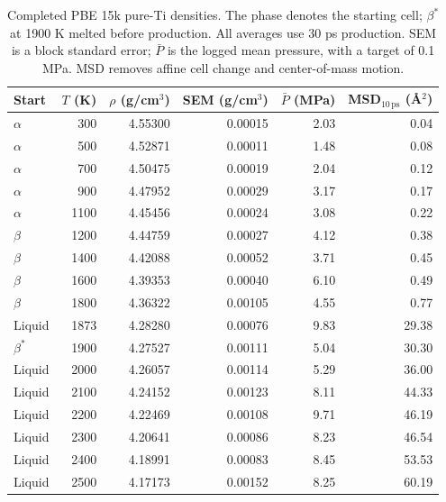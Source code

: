 \begin{table}[htbp]
\centering\small
\caption{Completed PBE 15k pure-Ti densities. The phase denotes the starting cell; $\beta^\ast$ at 1900 K melted before production. All averages use 30 ps production. SEM is a block standard error; $\bar P$ is the logged mean pressure, with a target of 0.1 MPa. MSD removes affine cell change and center-of-mass motion.}
\label{tab:ti_density_temperature15k}
\begin{tabular}{lrrrrr}
\toprule
Start & $T$ (K) & $\rho$ (g/cm$^3$) & SEM (g/cm$^3$) & $\bar P$ (MPa) & MSD$_{10\,\mathrm{ps}}$ (\AA$^2$)\\
\midrule
$\alpha$ & 300 & 4.55300 & 0.00015 & 2.03 & 0.04\\
$\alpha$ & 500 & 4.52871 & 0.00011 & 1.48 & 0.08\\
$\alpha$ & 700 & 4.50475 & 0.00019 & 2.04 & 0.12\\
$\alpha$ & 900 & 4.47952 & 0.00029 & 3.17 & 0.17\\
$\alpha$ & 1100 & 4.45456 & 0.00024 & 3.08 & 0.22\\
$\beta$ & 1200 & 4.44759 & 0.00027 & 4.12 & 0.38\\
$\beta$ & 1400 & 4.42088 & 0.00052 & 3.71 & 0.45\\
$\beta$ & 1600 & 4.39353 & 0.00040 & 6.10 & 0.49\\
$\beta$ & 1800 & 4.36322 & 0.00105 & 4.55 & 0.77\\
Liquid & 1873 & 4.28280 & 0.00076 & 9.83 & 29.38\\
$\beta^\ast$ & 1900 & 4.27527 & 0.00111 & 5.04 & 30.30\\
Liquid & 2000 & 4.26057 & 0.00114 & 5.29 & 36.00\\
Liquid & 2100 & 4.24152 & 0.00123 & 8.11 & 44.33\\
Liquid & 2200 & 4.22469 & 0.00108 & 9.71 & 46.19\\
Liquid & 2300 & 4.20641 & 0.00086 & 8.23 & 46.54\\
Liquid & 2400 & 4.18991 & 0.00083 & 8.45 & 53.53\\
Liquid & 2500 & 4.17173 & 0.00152 & 8.25 & 60.19\\
\bottomrule
\end{tabular}
\end{table}
